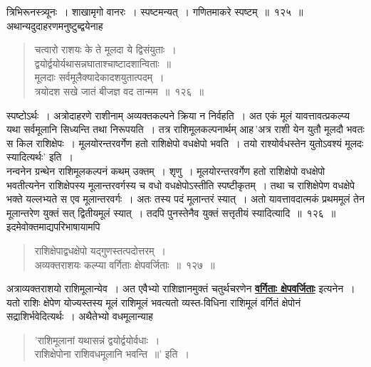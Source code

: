\documentclass[11pt, openany]{book}
\begin{document}
 त्रिभिरूनस्त्र्यूनः~। शाखामृगो वानरः~। स्पष्टमन्यत्~। गणितमाकरे स्पष्टम्~॥~१२५~॥\\

\vspace{-2mm}
अथान्यदुदाहरणमनुष्टुब्द्वयेनाह\textendash
\newpage
 \begin{quote}
     \eg 
      चत्वारो राशयः के ते मूलदा ये द्विसंयुताः~। \\
 द्वयोर्द्वयोर्यथासन्नघाताश्चाष्टादशान्विताः~॥ \\
 मूलदाः सर्वमूलैक्यादेकादशयुतात्पदम्~। \\
 त्रयोदश सखे जातं बीजज्ञ वद तान्मम~॥~१२६~॥ 
 \end{quote}
 
 स्पष्टोऽर्थः~। अत्रोदाहरणे राशीनाम् अव्यक्तकल्पने क्रिया न निर्वहति~। अत
एकं मूलं यावत्तावत्प्रकल्प्य यथा सर्वमूलानि सिध्यन्ति तथा निरूपयति~।
तत्र राशिमूलकल्पनार्थम् आह\textendash \,{\qt 'अत्र राशी येन युतौ मूलदौ भवतः स किल राशिक्षेपः~। मूलयोरन्तरवर्गेण हतो राशिक्षेपो वधक्षेपो भवति~। तयो राश्योर्वधस्तेन युतोऽवश्यं मूलदः स्यादित्यर्थः'} इति~। \\

\vspace{-4mm}
 नन्वनेन ग्रन्थेन राशिमूलकल्पनं कथम् उक्तम्~। शृणु~। मूलयोरन्तरवर्गेण हतो
राशिक्षेपो वधक्षेपो भवतीत्यनेन राशिक्षेपस्य मूलान्तरवर्गस्य च वधो
वधक्षेपोऽस्तीति स्पष्टीकृतम्~। तथा च राशिक्षेपेण वधक्षेपे भक्ते यल्लभ्यते स एव 
मूलान्तरवर्गः~। अतः तस्य पदं मूलान्तरं स्यात्~। अतो यावत्तावदात्मकं 
प्रथममूलं तेन मूलान्तरेण युक्तं सत् द्वितीयमूलं स्यात्~। तदपि
पुनस्तेनैव युक्तं सत्तृतीयं स्यादित्यादि~॥~१२६~॥~ \\

\vspace{-2mm}
 इदमेवोक्तमाद्यपरिभाषायामपि\textendash

 \label{127}
\begin{quote}
    \ab 
     राशिक्षेपाद्वधक्षेपो यद्गुणस्तत्पदोत्तरम्~। \\
 अव्यक्तराशयः कल्प्या वर्गिताः क्षेपवर्जिताः~॥~१२७~॥
\end{quote}
 
 अत्राव्यक्तराशयो राशिमूलान्येव~। अत एवैभ्यो राशिज्ञानमुक्तं
चतुर्थचरणेन \hyperref[127]{\textbf{वर्गिताः क्षेपवर्जिताः}} इत्यनेन~। यतो राशिः क्षेपेण योज्यस्तस्य मूलं
राशिमूलं भवत्यतो व्यस्त-विधिना राशिमूलं वर्गितं क्षेपोनं सद्राशिर्भवेदित्यर्थः~।
अथैतेभ्यो वधमूलान्याह\textendash 

\begin{quote}
    \qt
     'राशिमूलानां यथासन्नं द्वयोर्द्वयोर्वधाः~। \\
 राशिक्षेपोना राशिवधमूलानि भवन्ति~॥' इति~। 
\end{quote}
 
\end{document}
